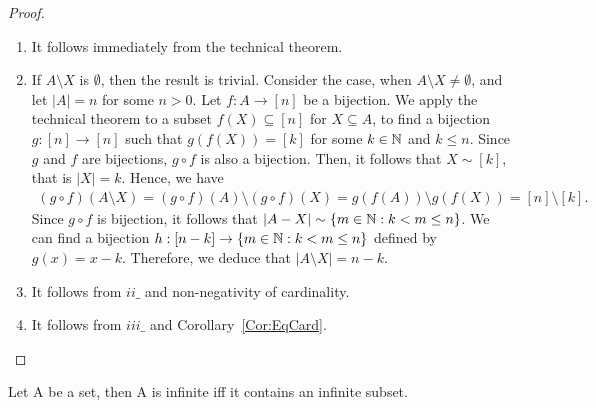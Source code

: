\documentclass[a4paper,english,12pt]{article}   	%
\begin{document}
\begin{proof}
\begin{enumerate}[$i\_$]
	\item It follows immediately from the technical theorem. %
	\item If $A \setminus X$ is $\emptyset$, then the result is trivial. Consider the case, when $A \setminus X \neq \emptyset$, and let $|A| = n$ for some $n > 0$. Let $f \colon A \to [n]$ be a bijection. We apply the technical theorem to a subset $f(X) \subseteq [n]$ for $X \subseteq A$, to find a bijection $g \colon [n] \to [n]$ such that $g(f(X)) =  [k]$ for some $k \in \mathbb{N}$ and $k \leq n$. Since $g$ and $f$ are bijections, $g \circ f$ is also a bijection. Then, it follows that $X \sim  [k]$, that is $|X|=k$. Hence, we have
\begin{align*} 
(g \circ f)(A \setminus X)=(g \circ f)(A) \setminus (g \circ f)(X) = g(f(A)) \setminus g(f(X)) = [n] \setminus [k].
\end{align*}
Since $g \circ f$ is bijection, it follows that $|A-X| \sim \{m \in \mathbb{N}: k < m \leq n\}$. We can find a bijection $h: [n-k] \to \{m \in \mathbb{N}: k < m \leq n\}$ defined by $g(x) = x-k$. Therefore, we deduce that $|A \setminus X|=n-k$.
	\item It follows from $ii\_$ and non-negativity of cardinality.
	\item It follows from $iii\_$ and Corollary~\ref{Cor:EqCard}.
\end{enumerate}


\end{proof}
\begin{cor} Let A be a set, then A is infinite iff it contains an infinite subset.
\end{cor}
\end{document}
